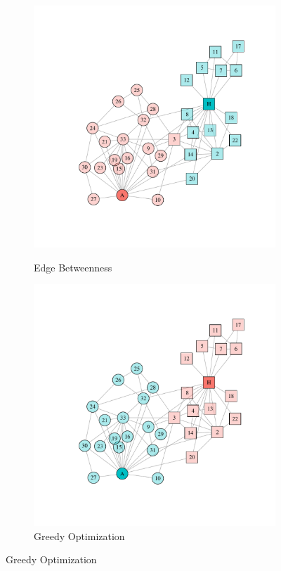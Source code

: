 \begin{figure}
\centering
\begin{subfigure}[b]{0.32\textwidth}
\caption{Edge Betweenness}
\includegraphics[width=\textwidth,trim={0.75in 0.75in 0.75in 0.75in}, clip=True]{edge_betweenness.pdf}
\label{fig:edge_betweenness}
\end{subfigure}
\hfill
\begin{subfigure}[b]{0.32\textwidth}
\caption{Greedy Optimization}
\includegraphics[width=\textwidth,trim={0.75in 0.75in 0.75in 0.75in}, clip=True]{fast_greedy.pdf}

\end{subfigure}
\end{figure}
